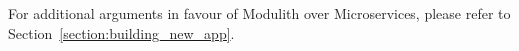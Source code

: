 \begin{note}
    For additional arguments in favour of Modulith over Microservices, please refer to Section~\ref{section:building_new_app}.
\end{note}



